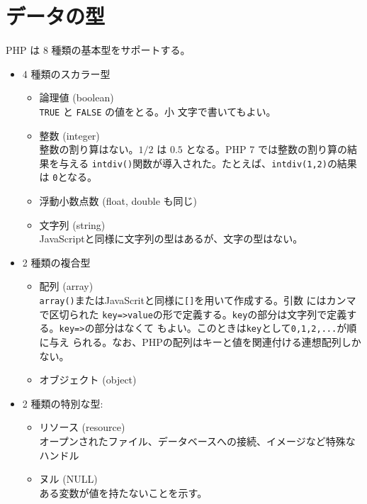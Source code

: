 \section{データの型}
PHP は 8 種類の基本型をサポートする。
\begin{itemize}
 \item 4 種類のスカラー型
 \begin{itemize}
  \item 論理値 (boolean)\\\texttt{TRUE} と \texttt{FALSE} の値をとる。小
	文字で書いてもよい。
  \item 整数 (integer)\\整数の割り算はない。$1/2$ は %
	$0.5$ となる。{PHP 7 では整数の割り算の結果を与える
        \Verb+intdiv()+関数が導入された。たとえば、\Verb+intdiv(1,2)+の結果は
        \Verb+0+となる。}
  \item 浮動小数点数 (float, double も同じ)
  \item 文字列 (string)\\
JavaScriptと同様に文字列の型はあるが、文字の型はない。
 \end{itemize}
 \item 2 種類の複合型
 \begin{itemize}
  \item 配列 (array)\\
\texttt{array()}またはJavaScritと同様に\texttt{[]}を用いて作成する。引数
        にはカンマで区切られた
	\texttt{key=>value}の形で定義する。\texttt{key}の部分は文字列で定義す
        る。\texttt{key=>}の部分はなくて
	もよい。このときは\texttt{key}として\texttt{0,1,2,...}が順に与え
	られる。なお、PHPの配列はキーと値を関連付ける連想配列しかない。
  \item オブジェクト (object)
 \end{itemize}
 \item 2 種類の特別な型:
\begin{itemize}
 \item リソース (resource)\\
オープンされたファイル、データベースへの接続、イメージなど特殊なハンドル
       
 \item ヌル (NULL)\\
ある変数が値を持たないことを示す。
\end{itemize}
\end{itemize}
